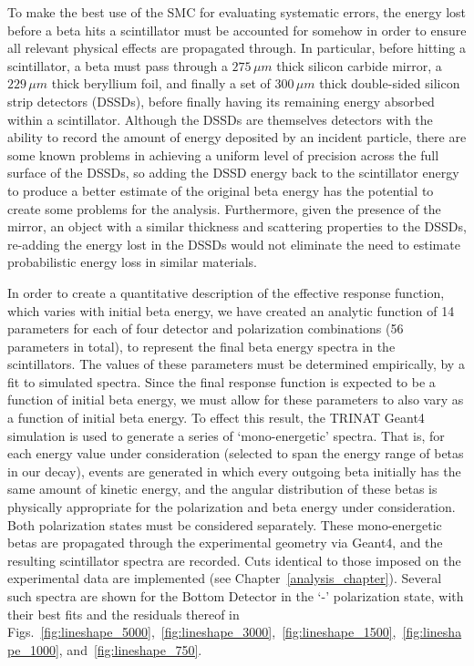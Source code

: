 To make the best use of the SMC for evaluating systematic errors, the energy lost before a beta hits a scintillator must be accounted for somehow in order to ensure all relevant physical effects are propagated through.  In particular, before hitting a scintillator, a beta must pass through a $275\,\mu m$ thick silicon carbide mirror, a $229\,\mu m$ thick beryllium foil, %
and finally a set of $300\,\mu m$ thick double-sided silicon strip detectors (DSSDs), before finally having its remaining energy absorbed within a scintillator.  Although the DSSDs are themselves detectors with the ability to record the amount of energy deposited by an incident particle, there are some known problems in achieving a uniform level of precision across the full surface of the DSSDs, so adding the DSSD energy back to the scintillator energy to produce a better estimate of the original beta energy has the potential to create some problems for the analysis.  Furthermore, given the presence of the mirror, an object with a similar thickness and scattering properties to the DSSDs, re-adding the energy lost in the DSSDs would not eliminate the need to estimate probabilistic energy loss in similar materials.  

In order to create a quantitative description of the effective response function, which varies with initial beta energy, we have created an analytic function of 14 parameters for each of four detector and polarization combinations (56 parameters in total), to represent the final beta energy spectra in the scintillators.  The values of these parameters must be determined empirically, by a fit to simulated spectra.  Since the final response function is expected to be a function of initial beta energy, we must allow for these parameters to also vary as a function of initial beta energy.  To effect this result, 
the TRINAT Geant4 simulation is used to generate a series of `mono-energetic' spectra.  That is, for each energy value under consideration (selected to span the energy range of betas in our decay), events are generated in which every outgoing beta initially has the same amount of kinetic energy, and the angular distribution of these betas is physically appropriate for the polarization and beta energy under consideration.  Both polarization states must be considered separately.  These mono-energetic betas are propagated through the experimental geometry via Geant4, and the resulting scintillator spectra are recorded.  Cuts identical to those imposed on the experimental data are implemented (see Chapter~\ref{analysis_chapter}).    Several such spectra are shown for the Bottom Detector in the `-' polarization state, with their best fits and the residuals thereof in Figs.~\ref{fig:lineshape_5000},~\ref{fig:lineshape_3000},~\ref{fig:lineshape_1500},~\ref{fig:lineshape_1000}, and~\ref{fig:lineshape_750}.

